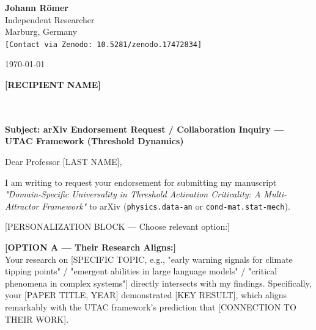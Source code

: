 \documentclass[11pt,a4paper]{article}
\begin{document}
\begin{flushleft}
\textbf{Johann Römer}\\
Independent Researcher\\
Marburg, Germany\\
\texttt{[Contact via Zenodo: 10.5281/zenodo.17472834]}\\
\end{flushleft}

\vspace{1em}

\begin{flushleft}
\today
\end{flushleft}

\vspace{1em}

\begin{flushleft}
\textbf{[RECIPIENT NAME]}\\
[RECIPIENT TITLE]\\
[RECIPIENT INSTITUTION]\\
[RECIPIENT EMAIL]
\end{flushleft}

\vspace{1em}

\textbf{Subject: arXiv Endorsement Request / Collaboration Inquiry — UTAC Framework (Threshold Dynamics)}

\vspace{1em}

Dear Professor [LAST NAME],

\vspace{0.5em}

I am writing to request your endorsement for submitting my manuscript \textit{"Domain-Specific Universality in Threshold Activation Criticality: A Multi-Attractor Framework"} to arXiv (\texttt{physics.data-an} or \texttt{cond-mat.stat-mech}). 

[PERSONALIZATION BLOCK — Choose relevant option:]

\textbf{[OPTION A — Their Research Aligns:]}\\
Your research on [SPECIFIC TOPIC, e.g., "early warning signals for climate tipping points" / "emergent abilities in large language models" / "critical phenomena in complex systems"] directly intersects with my findings. Specifically, your [PAPER TITLE, YEAR] demonstrated [KEY RESULT], which aligns remarkably with the UTAC framework's prediction that [CONNECTION TO THEIR WORK].
\end{document}
